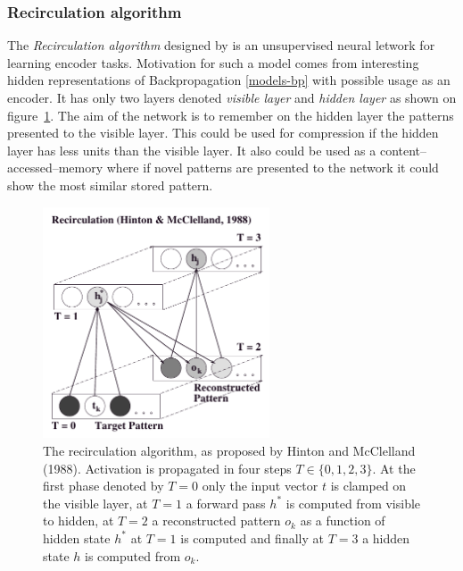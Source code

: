 \subsubsection{Recirculation algorithm}
\label{models-recirc} 


The \emph{Recirculation algorithm} designed by \citet{hinton1988learning} is an unsupervised neural letwork for learning encoder tasks. Motivation for such a model comes from interesting hidden representations of Backpropagation \ref{models-bp} with possible usage as an encoder. It has only two layers denoted \emph{visible layer} and \emph{hidden layer} as shown on figure~\ref{fig:models-recirc}. The aim of the network is to remember on the hidden layer the patterns presented to the visible layer. This could be used for compression if the hidden layer has less units than the visible layer. It also could be used as a content--accessed--memory where if novel patterns are presented to the network it could show the most similar stored pattern. 

\begin{figure}[H]
  \centering
\includegraphics[width=0.6\textwidth]{img/recirculation.png}
  \caption{The recirculation algorithm, as proposed by Hinton and McClelland (1988). Activation is propagated in four steps $T \in \{0,1,2,3\}$. At the first phase denoted by $T=0$ only the input vector $t$ is clamped on the visible layer, at $T=1$ a forward pass $h^{*}$ is computed from visible to hidden, at $T=2$ a reconstructed pattern $o_k$ as a function of hidden state $h^{*}$ at $T=1$ is computed and finally at $T=3$ a hidden state $h$ is computed from $o_k$.}
  \label{fig:models-recirc}
\end{figure}

